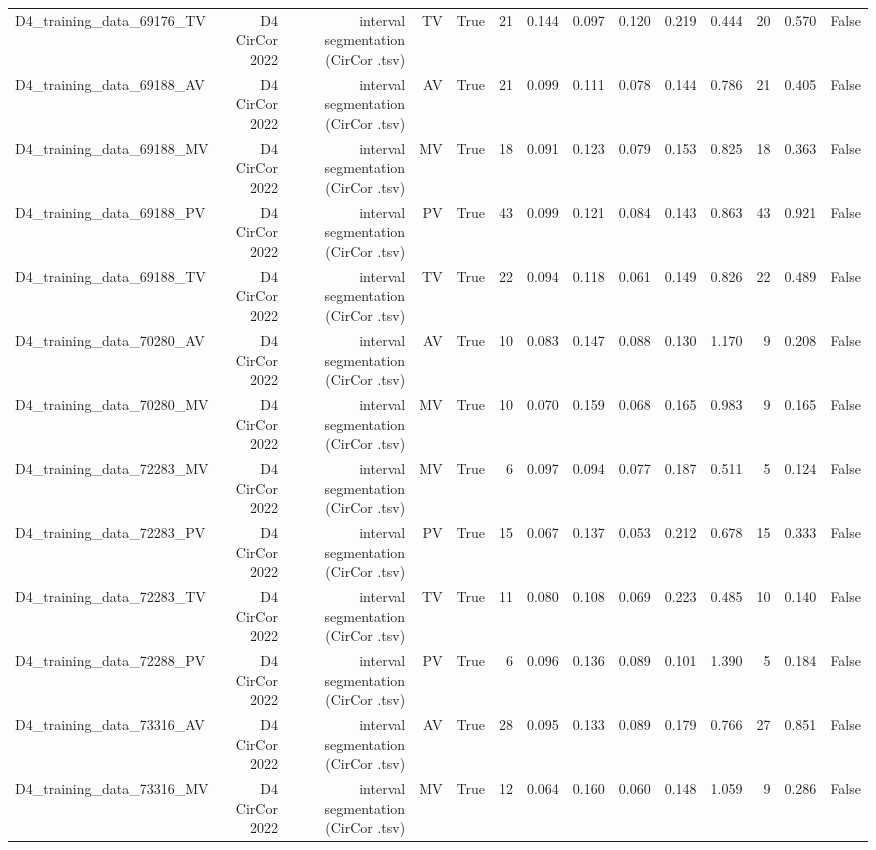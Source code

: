 \begin{table}[htbp]
\begin{tabular}{lrrrrrrrrrrrrr}
    D4\_training\_data\_69176\_TV & D4 CirCor 2022 & interval segmentation (CirCor .tsv) & TV & True & 21 & 0.144 & 0.097 & 0.120 & 0.219 & 0.444 & 20 & 0.570 & False \\
    D4\_training\_data\_69188\_AV & D4 CirCor 2022 & interval segmentation (CirCor .tsv) & AV & True & 21 & 0.099 & 0.111 & 0.078 & 0.144 & 0.786 & 21 & 0.405 & False \\
    D4\_training\_data\_69188\_MV & D4 CirCor 2022 & interval segmentation (CirCor .tsv) & MV & True & 18 & 0.091 & 0.123 & 0.079 & 0.153 & 0.825 & 18 & 0.363 & False \\
    D4\_training\_data\_69188\_PV & D4 CirCor 2022 & interval segmentation (CirCor .tsv) & PV & True & 43 & 0.099 & 0.121 & 0.084 & 0.143 & 0.863 & 43 & 0.921 & False \\
    D4\_training\_data\_69188\_TV & D4 CirCor 2022 & interval segmentation (CirCor .tsv) & TV & True & 22 & 0.094 & 0.118 & 0.061 & 0.149 & 0.826 & 22 & 0.489 & False \\
    D4\_training\_data\_70280\_AV & D4 CirCor 2022 & interval segmentation (CirCor .tsv) & AV & True & 10 & 0.083 & 0.147 & 0.088 & 0.130 & 1.170 & 9 & 0.208 & False \\
    D4\_training\_data\_70280\_MV & D4 CirCor 2022 & interval segmentation (CirCor .tsv) & MV & True & 10 & 0.070 & 0.159 & 0.068 & 0.165 & 0.983 & 9 & 0.165 & False \\
    D4\_training\_data\_72283\_MV & D4 CirCor 2022 & interval segmentation (CirCor .tsv) & MV & True & 6 & 0.097 & 0.094 & 0.077 & 0.187 & 0.511 & 5 & 0.124 & False \\
    D4\_training\_data\_72283\_PV & D4 CirCor 2022 & interval segmentation (CirCor .tsv) & PV & True & 15 & 0.067 & 0.137 & 0.053 & 0.212 & 0.678 & 15 & 0.333 & False \\
    D4\_training\_data\_72283\_TV & D4 CirCor 2022 & interval segmentation (CirCor .tsv) & TV & True & 11 & 0.080 & 0.108 & 0.069 & 0.223 & 0.485 & 10 & 0.140 & False \\
    D4\_training\_data\_72288\_PV & D4 CirCor 2022 & interval segmentation (CirCor .tsv) & PV & True & 6 & 0.096 & 0.136 & 0.089 & 0.101 & 1.390 & 5 & 0.184 & False \\
    D4\_training\_data\_73316\_AV & D4 CirCor 2022 & interval segmentation (CirCor .tsv) & AV & True & 28 & 0.095 & 0.133 & 0.089 & 0.179 & 0.766 & 27 & 0.851 & False \\
    D4\_training\_data\_73316\_MV & D4 CirCor 2022 & interval segmentation (CirCor .tsv) & MV & True & 12 & 0.064 & 0.160 & 0.060 & 0.148 & 1.059 & 9 & 0.286 & False \\

\end{tabular}
\end{table}
